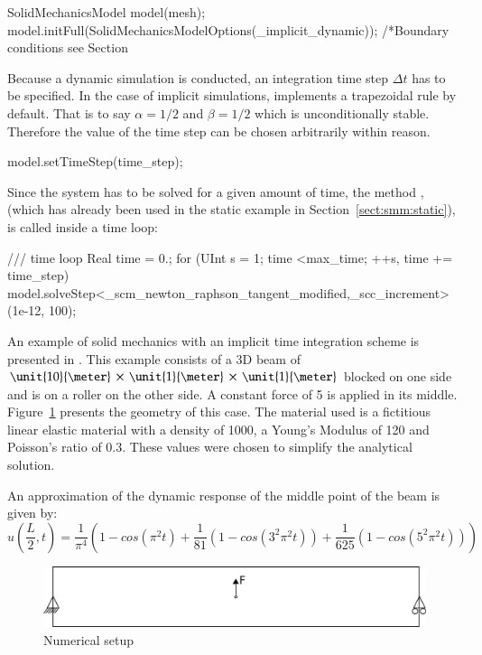 \begin{cpp}
SolidMechanicsModel model(mesh);
model.initFull(SolidMechanicsModelOptions(_implicit_dynamic));
/*Boundary conditions see Section~%
\end{cpp}
Because a dynamic simulation is conducted, an integration time step
$\Delta t$ has to be specified. In the case of implicit simulations,
\akantu implements a trapezoidal rule by default.  That is to say
$\alpha = 1/2$ and $\beta = 1/2$ which is unconditionally
stable. Therefore the value of the time step can be chosen arbitrarily
within reason.  
\begin{cpp}
model.setTimeStep(time_step);
\end{cpp}
Since the system has to be solved for a given amount of time, the
method , (which has already been used in the static
example in Section~\ref{sect:smm:static}), is called inside a time
loop:
\begin{cpp}
/// time loop
Real time = 0.;
for (UInt s = 1; time <max_time; ++s, time += time_step) {
  model.solveStep<_scm_newton_raphson_tangent_modified,_scc_increment>(1e-12, 100);
}
\end{cpp}
An example of solid mechanics with an implicit time integration scheme
is presented in
.  This example
consists of a 3D beam of
$\unit{10}{\meter}\,\times\,\unit{1}{\meter}\,\times\,\unit{1}{\meter}$
blocked on one side and is on a roller on the other side.  A constant
force of \unit{5}{\kilo\newton} is applied in its middle.
Figure~\ref{fig:smm:implicit:dynamic} presents the geometry of this
case. The material used is a fictitious linear elastic material with a
density of \unit{1000}{\kilogrampercubicmetre}, a Young's Modulus of
\unit{120}{\mega\pascal} and Poisson's ratio of $0.3$. These values
were chosen to simplify the analytical solution.

An approximation of the dynamic response of the middle point of the
beam is given by:
\begin{equation}
  \label{eqn:smm:implicit}
  u\left(\frac{L}{2}, t\right)
  = \frac{1}{\pi^4} \left(1 - cos\left(\pi^2 t\right) +
    \frac{1}{81}\left(1 - cos\left(3^2 \pi^2 t\right)\right) +
    \frac{1}{625}\left(1 - cos\left(5^2 \pi^2 t\right)\right)\right)
\end{equation}

\begin{figure}[!htb]
  \centering
  \includegraphics[scale=.6]{figures/implicit_dynamic}
  \caption{Numerical setup}
  \label{fig:smm:implicit:dynamic}
\end{figure}

